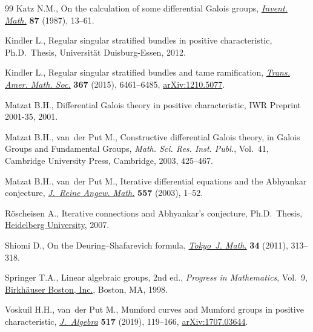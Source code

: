 \begin{thebibliography}{99}
Katz N.M., On the calculation of some differential {G}alois groups,
 \href{https://doi.org/10.1007/BF01389152}{\textit{Invent. Math.}} \textbf{87} (1987), 13--61.

Kindler L., Regular singular stratified bundles in positive characteristic,
 Ph.D.~Thesis, Universit\"at Duisburg-Essen, 2012.

Kindler L., Regular singular stratified bundles and tame ramification,
 \href{https://doi.org/10.1090/S0002-9947-2014-06143-6}{\textit{Trans. Amer. Math. Soc.}} \textbf{367} (2015), 6461--6485,
 \href{https://arxiv.org/abs/1210.5077}{arXiv:1210.5077}.

Matzat B.H., Differential {G}alois theory in positive characteristic, {IWR}
 Preprint 2001-35, 2001.

Matzat B.H., van~der Put M., Constructive differential {G}alois theory, in
 Galois Groups and Fundamental Groups, \textit{Math. Sci. Res. Inst. Publ.},
 Vol.~41, Cambridge University Press, Cambridge, 2003, 425--467.

Matzat B.H., van~der Put M., Iterative differential equations and the
 {A}bhyankar conjecture, \href{https://doi.org/10.1515/crll.2003.032}{\textit{J.~Reine Angew. Math.}} \textbf{557} (2003),
 1--52.

R\"oscheisen A., Iterative connections and {A}bhyankar's conjecture, Ph.D.~Thesis, \href{https://doi.org/10.11588/heidok.00007179}{Heidelberg University}, 2007.

Shiomi D., On the {D}euring--{S}hafarevich formula, \href{https://doi.org/10.3836/tjm/1327931387}{\textit{Tokyo~J. Math.}}
 \textbf{34} (2011), 313--318.

Springer T.A., Linear algebraic groups, 2nd ed., \textit{Progress in Mathematics},
 Vol.~9, \href{https://doi.org/10.1007/978-0-8176-4840-4}{Birkh\"{a}user Boston, Inc.}, Boston, MA, 1998.

Voskuil H.H., van~der Put M., Mumford curves and {M}umford groups in positive
 characteristic, \href{https://doi.org/10.1016/j.jalgebra.2018.09.036}{\textit{J.~Algebra}} \textbf{517} (2019), 119--166,
 \href{https://arxiv.org/abs/1707.03644}{arXiv:1707.03644}.

\end{thebibliography}

